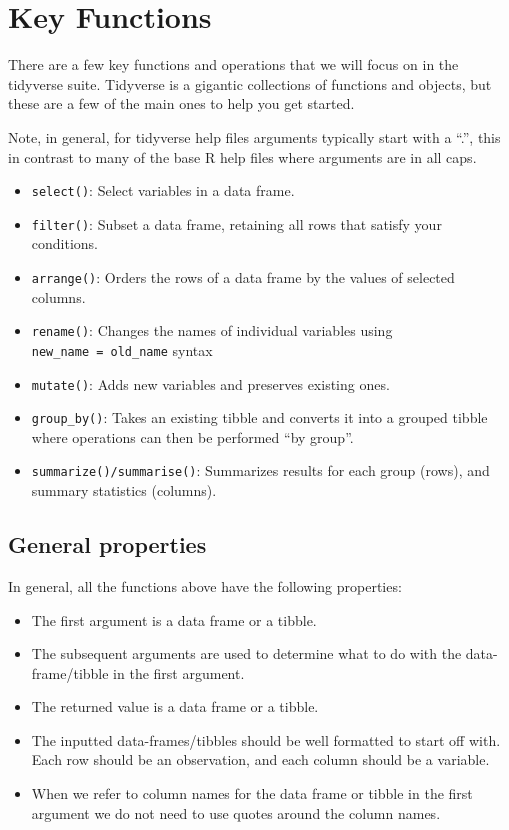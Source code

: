 \documentclass[
]{book}
\begin{document}
\hypertarget{key-functions}{%
\section{Key Functions}\label{key-functions}}

There are a few key functions and operations that we will focus on in the tidyverse suite. Tidyverse is a gigantic collections of functions and objects, but these are a few of the main ones to help you get started.

Note, in general, for tidyverse help files arguments typically start with a ``.'', this in contrast to many of the base R help files where arguments are in all caps.

\begin{itemize}
\item
  \texttt{select()}: Select variables in a data frame.
\item
  \texttt{filter()}: Subset a data frame, retaining all rows that satisfy your conditions.
\item
  \texttt{arrange()}: Orders the rows of a data frame by the values of selected columns.
\item
  \texttt{rename()}: Changes the names of individual variables using \texttt{new\_name\ =\ old\_name} syntax
\item
  \texttt{mutate()}: Adds new variables and preserves existing ones.
\item
  \texttt{group\_by()}: Takes an existing tibble and converts it into a grouped tibble where operations can then be performed ``by group''.
\item
  \texttt{summarize()/summarise()}: Summarizes results for each group (rows), and summary statistics (columns).
\end{itemize}

\hypertarget{general-properties}{%
\subsection{General properties}\label{general-properties}}

In general, all the functions above have the following properties:

\begin{itemize}
\item
  The first argument is a data frame or a tibble.
\item
  The subsequent arguments are used to determine what to do with the data-frame/tibble in the first argument.
\item
  The returned value is a data frame or a tibble.
\item
  The inputted data-frames/tibbles should be well formatted to start off with. Each row should be an observation, and each column should be a variable.
\item
  When we refer to column names for the data frame or tibble in the first argument we do not need to use quotes around the column names.
\end{itemize}
\end{document}
